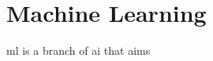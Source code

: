 \section{Machine Learning}
\label{sec:theoretical_background:ml}

\Acrlong{ml} is a branch of \acrlong{ai} that aims 
